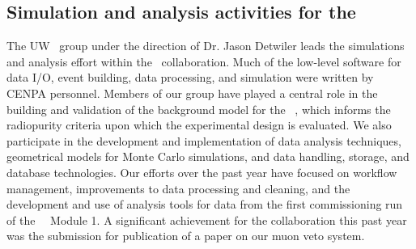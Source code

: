 \subsection {Simulation and analysis activities for the \MJ\ \MJDemo \label{MJDSimArticle}}


\noindent The UW \MJ\ group under the direction of Dr. Jason Detwiler leads the simulations and analysis effort within the \MJ\ collaboration. Much of the low-level software for data I/O, event building, data processing, and simulation were written by CENPA personnel. Members of our group have played a central role in the building and validation of the background model for the \MJ\ \MJDemo, which informs the radiopurity criteria upon which the experimental design is evaluated. We also participate in the development and implementation of data analysis techniques, geometrical models for Monte Carlo simulations, and data handling, storage, and database technologies. Our efforts over the past year have focused on workflow management, improvements to data processing and cleaning, and the development and use of analysis tools for data from the first commissioning run of the \MJ\ \MJDemo\ Module 1. A significant achievement for the collaboration this past year was the submission for publication of a paper on our muon veto system.

